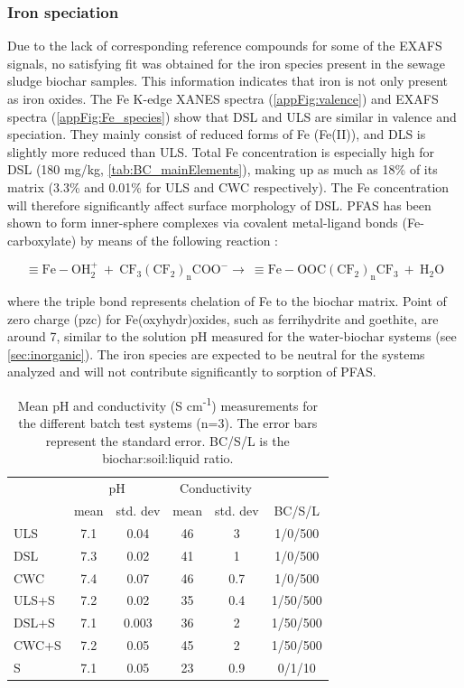 \subsubsection{Iron speciation}
Due to the lack of corresponding reference compounds for some of the EXAFS signals, no satisfying fit was obtained for the iron species present in the sewage sludge biochar samples. This information indicates that iron is not only present as iron oxides. The Fe K-edge XANES spectra (\cref{appFig:valence}) and EXAFS spectra (\cref{appFig:Fe_species}) show that DSL and ULS are similar in valence and speciation. They mainly consist of reduced forms of Fe (Fe(II)), and DLS is slightly more reduced than ULS. Total Fe concentration is especially high for DSL (180 mg/kg, \cref{tab:BC_mainElements}), making up as much as 18\% of its matrix (3.3\% and 0.01\% for ULS and CWC respectively). The Fe concentration will therefore significantly affect surface morphology of DSL. PFAS has been shown to form inner-sphere complexes via covalent metal-ligand bonds (Fe-carboxylate) by means of the following reaction \citep{du2014adsorption}:

\begin{equation}
    \mathrm{\equiv Fe-OH_2^+ ~ + ~ CF_3(CF_2)_nCOO^- \rightarrow ~ \equiv Fe-OOC(CF_2)_nCF_3 ~+~ H_2O}
\end{equation}

where the triple bond represents chelation of Fe to the biochar matrix. Point of zero charge (pzc) for Fe(oxyhydr)oxides, such as ferrihydrite and goethite, are around 7, similar to the solution pH measured for the water-biochar systems (see \cref{sec:inorganic}). The iron species are expected to be neutral for the systems analyzed and will not contribute significantly to sorption of PFAS. 

\begin{table}
\centering
\caption{Mean pH and conductivity (\textmu S cm\textsuperscript{-1}) measurements for the different batch test systems (n=3). The error bars represent the standard error. BC/S/L is the biochar:soil:liquid ratio.}
\label{tab:pHcond}
\begin{tabular}{lccccc}
\toprule
 & \multicolumn{2}{c}{pH} & \multicolumn{2}{c}{Conductivity} & \\ \cmidrule(l){2-3} \cmidrule(l){4-5}
 & mean & std. dev & mean & std. dev & BC/S/L\\ 
\midrule
ULS & 7.1 & 0.04 & 46 & 3 & 1/0/500\\
DSL & 7.3 & 0.02 & 41 & 1 & 1/0/500\\
CWC & 7.4 & 0.07 & 46 & 0.7 & 1/0/500\\
ULS+S & 7.2 & 0.02 & 35 & 0.4 & 1/50/500\\
DSL+S & 7.1 & 0.003 & 36 & 2 & 1/50/500\\
CWC+S & 7.2 & 0.05 & 45 & 2 & 1/50/500\\
S & 7.1 & 0.05 & 23 & 0.9 & 0/1/10\\
\bottomrule
\end{tabular}
\end{table}

